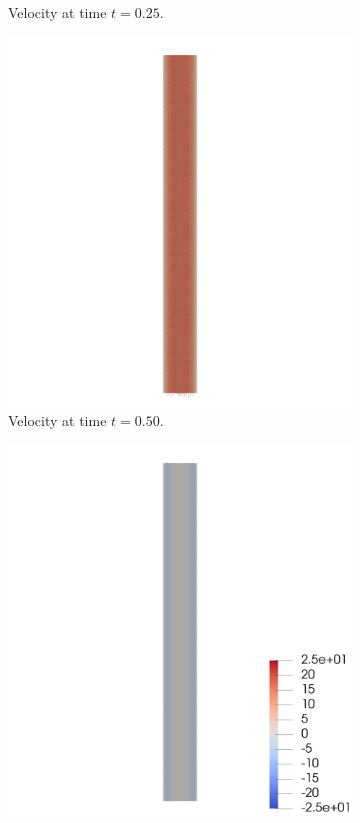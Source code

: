 \documentclass[a4paper,11pt,oneside]{book}
\begin{document}
\begin{figure}[h!]
\begin{subfigure}[b]{0.5\linewidth}
        \centering 
    \caption{Velocity at time $t = 0.25$.} 
    \label{fig1:b} 
    \vspace{4ex}
  \end{subfigure} 
  \begin{subfigure}[b]{0.5\linewidth}
    \centering
    \includegraphics[width=1.2\linewidth]{images/velocity_fixed_050.png} 
        \centering
    \caption{Velocity at time $t = 0.50$.} 
    \label{fig1:c} 
  \end{subfigure}%
  \begin{subfigure}[b]{0.5\linewidth}
    \centering
    \includegraphics[width=1.2\linewidth]{images/velocity_fixed_075.png} 

\end{subfigure}
\end{figure}
\end{document}

